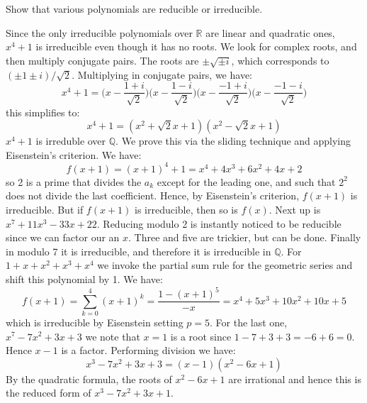 \documentclass{article}                                                        %
\begin{document}
        \begin{problem}
            Show that various polynomials are reducible or irreducible.
        \end{problem}
        \begin{solution}
            Since the only irreducible polynomials over $\mathbb{R}$ are linear
            and quadratic ones, $x^{4}+1$ is irreducible even though it has no
            roots. We look for complex roots, and then multiply conjugate pairs.
            The roots are $\pm\sqrt{\pm{i}}$, which corresponds to
            $(\pm{1}\pm{i})/\sqrt{2}$. Multiplying in conjugate pairs, we have:
            \begin{equation}
                x^{4}+1=\big(x-\frac{1+i}{\sqrt{2}}\big)
                        \big(x-\frac{1-i}{\sqrt{2}}\big)
                        \big(x-\frac{\minus{1}+i}{\sqrt{2}}\big)
                        \big(x-\frac{\minus{1}-i}{\sqrt{2}}\big)
            \end{equation}
            this simplifies to:
            \begin{equation}
                x^{4}+1=(x^{2}+\sqrt{2}x+1)(x^{2}-\sqrt{2}x+1)
            \end{equation}
            $x^{4}+1$ is irreduble over $\mathbb{Q}$. We prove this via the
            sliding technique and applying Eisenstein's criterion. We have:
            \begin{equation}
                f(x+1)=(x+1)^{4}+1
                =x^{4}+4x^{3}+6x^{2}+4x+2
            \end{equation}
            so 2 is a prime that divides the $a_{k}$ except for the leading one,
            and such that $2^{2}$ does not divide the last coefficient.
            Hence, by Eisenstein's criterion, $f(x+1)$ is irreducible. But if
            $f(x+1)$ is irreducible, then so is $f(x)$. Next up is
            $x^{7}+11x^{3}-33x+22$. Reducing modulo 2 is instantly noticed to be
            reducible since we can factor our an $x$. Three and five are
            trickier, but can be done. Finally in modulo 7 it is irreducible,
            and therefore it is irreducible in $\mathbb{Q}$. For
            $1+x+x^{2}+x^{3}+x^{4}$ we invoke the partial sum rule for the
            geometric series and shift this polynomial by 1. We have:
            \begin{equation}
                f(x+1)=\sum_{k=0}^{4}(x+1)^{k}=\frac{1-(x+1)^{5}}{\minus{x}}
                =x^{4}+5x^{3}+10x^{2}+10x+5
            \end{equation}
            which is irreducible by Eisenstein setting $p=5$. For the last one,
            $x^{7}-7x^{2}+3x+3$ we note that $x=1$ is a root since
            $1-7+3+3=\minus{6}+6=0$. Hence $x-1$ is a factor. Performing
            division we have:
            \begin{equation}
                x^{3}-7x^{2}+3x+3=(x-1)(x^{2}-6x+1)
            \end{equation}
            By the quadratic formula, the roots of $x^{2}-6x+1$ are irrational
            and hence this is the reduced form of $x^{3}-7x^{2}+3x+1$.
        \end{solution}
\end{document}
